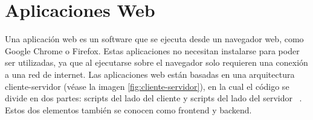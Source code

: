 %

\section{Aplicaciones Web}
Una aplicación web es un software que se ejecuta desde un navegador web, como Google Chrome o Firefox. Estas aplicaciones no necesitan instalarse para poder ser utilizadas, ya que al ejecutarse sobre el navegador solo requieren una conexión a una red de internet. Las aplicaciones web están basadas en una arquitectura cliente-servidor (véase la imagen \ref{fig:cliente-servidor}), en la cual el código se divide en dos partes: scripts del lado del cliente y scripts del lado del servidor ~\cite{apliacionWebAmazon}. Estos dos elementos también se conocen como frontend y backend.

